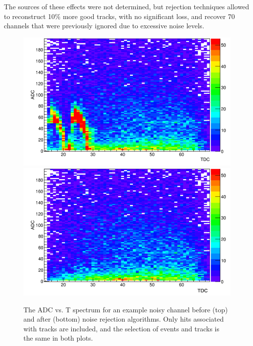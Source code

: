 \documentclass[twocolumn,showpacs,superscriptaddress,groupedaddress]{revtex4}
\begin{document}
The sources of these effects were not determined, but rejection techniques 
allowed to reconstruct 10\% more good tracks, with no significant loss, and 
recover 70 channels that were previously ignored due to excessive noise levels.

\begin{figure}[tb]\centering
\includegraphics[scale=0.27]{fig/noisy_pad_before_rejection2.png}
\includegraphics[scale=0.27]{fig/noisy_pad_after_rejection2.png}
\caption{The ADC vs. T spectrum for an example noisy channel before (top) and 
after (bottom) noise rejection algorithms.  Only hits associated with tracks 
are included, and the selection of events and tracks is the same in both 
plots.}
\label{fig:noise}
\end{figure}
\end{document}
